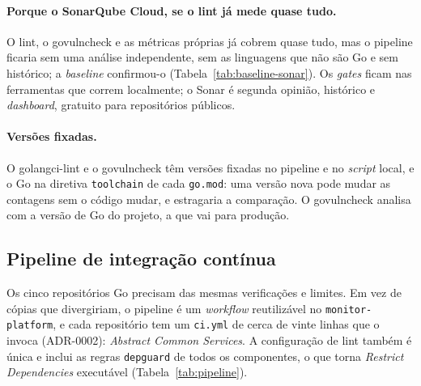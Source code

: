 \paragraph{Porque o SonarQube Cloud, se o lint já mede quase tudo.}
O lint, o govulncheck e as métricas próprias já cobrem quase tudo, mas o pipeline ficaria sem uma análise
independente, sem as linguagens que não são Go e sem histórico; a \emph{baseline} confirmou-o
(Tabela~\ref{tab:baseline-sonar}). Os \emph{gates} ficam nas ferramentas que correm localmente; o Sonar é segunda opinião,
histórico e \emph{dashboard}, gratuito para repositórios públicos.

\paragraph{Versões fixadas.}
O golangci-lint e o govulncheck têm versões fixadas no pipeline e no \emph{script} local, e o Go na diretiva
\texttt{toolchain} de cada \texttt{go.mod}: uma versão nova pode mudar as contagens sem o código mudar, e estragaria
a comparação. O govulncheck analisa com a versão de Go do projeto, a que vai para produção.

\subsection{Pipeline de integração contínua}
\label{sec:pipeline}

Os cinco repositórios Go precisam das mesmas verificações e limites. Em vez de cópias que divergiriam, o pipeline
é um \emph{workflow} reutilizável no \texttt{monitor-platform}, e cada repositório tem um \texttt{ci.yml} de cerca de
vinte linhas que o invoca (ADR-0002): \emph{Abstract Common Services}. A configuração de lint também é única e
inclui as regras \texttt{depguard} de todos os componentes, o que torna \emph{Restrict Dependencies} executável
(Tabela~\ref{tab:pipeline}).

